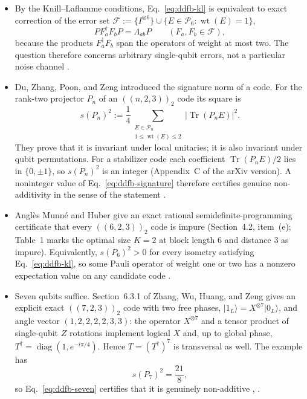 \begin{itemize}
  \item By the Knill--Laflamme conditions, Eq.~\eqref{eq:ddfb-kl} is equivalent to
  exact correction of the error set
  $\mathcal F:=\{I^{\otimes6}\}\cup\{E\in\mathcal P_6:\operatorname{wt}(E)=1\}$,
  \begin{equation}
    PF_a^\dagger F_bP=\Lambda_{ab}P
    \qquad(F_a,F_b\in\mathcal F),
    \label{eq:ddfb-correction}
  \end{equation}
  because the products $F_a^\dagger F_b$ span the operators of weight at most
  two.  The question therefore concerns arbitrary single-qubit errors, not a
  particular noise channel .

  \item Du, Zhang, Poon, and Zeng introduced the signature norm of a code.  For the
  rank-two projector $P_n$ of an $((n,2,3))_2$ code its square is
  \begin{equation}
    s(P_n)^2:=\frac14
    \sum_{\substack{E\in\mathcal P_n\\ 1\leq\operatorname{wt}(E)\leq2}}
    \lvert\operatorname{Tr}(P_nE)\rvert^2 .
    \label{eq:ddfb-signature}
  \end{equation}
  They prove that it is invariant under local unitaries; it is also invariant
  under qubit permutations.  For a stabilizer code each coefficient
  $\operatorname{Tr}(P_nE)/2$ lies in $\{0,\pm1\}$, so $s(P_n)^2$ is an integer
  (Appendix~C of the arXiv version).  A noninteger value of
  Eq.~\eqref{eq:ddfb-signature} therefore certifies genuine non-additivity in
  the sense of the statement .

  \item Angl\`es Munn\'e and Huber give an exact rational semidefinite-programming
  certificate that every $((6,2,3))_2$ code is impure (Section~4.2, item~(e);
  Table~1 marks the optimal size $K=2$ at block length $6$ and distance $3$ as
  impure).  Equivalently, $s(P_6)^2>0$ for every isometry satisfying
  Eq.~\eqref{eq:ddfb-kl}, so some Pauli operator of weight one or two has a
  nonzero expectation value on any candidate code
  .

  \item Seven qubits suffice.  Section~6.3.1 of Zhang, Wu, Huang, and Zeng gives an
  explicit exact $((7,2,3))_2$ code with two free phases,
  $\lvert1_L\rangle=X^{\otimes7}\lvert0_L\rangle$, and angle vector
  $(1,2,2,2,2,3,3)$: the operator $X^{\otimes7}$ and a tensor product of
  single-qubit $Z$ rotations implement logical $X$ and, up to global phase,
  $T^\dagger=\operatorname{diag}(1,e^{-i\pi/4})$.  Hence $T=(T^\dagger)^7$ is
  transversal as well.  The example has
  \begin{equation}
    s(P_7)^2=\frac{21}{8},
    \label{eq:ddfb-seven}
  \end{equation}
  so Eq.~\eqref{eq:ddfb-seven} certifies that it is genuinely non-additive
  ,
  .


\end{itemize}
